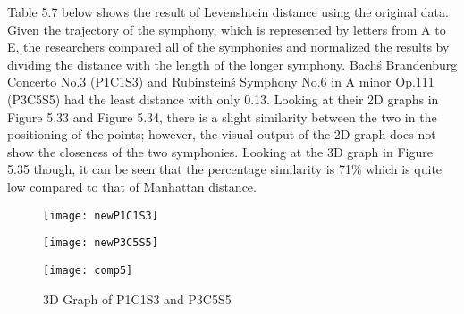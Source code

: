 Table 5.7 below shows the result of Levenshtein distance using the original data. Given the trajectory of the symphony, which is represented by letters from A to E, the researchers compared all of the symphonies and normalized the results by dividing the distance with the length of the longer symphony. Bach\'s Brandenburg Concerto No.3 (P1C1S3) and Rubinstein\'s Symphony No.6 in A minor Op.111 (P3C5S5) had the least distance with only 0.13. Looking at their 2D graphs in Figure 5.33 and Figure 5.34, there is a slight similarity between the two in the positioning of the points; however, the visual output of the 2D graph does not show the closeness of the two symphonies. Looking at the 3D graph in Figure 5.35 though, it can be seen that 
the percentage similarity is 71\% which is quite low compared to that of Manhattan distance.

\begin{figure}[H]
\begin{minipage}{.5\textwidth}
  \centering
  \texttt{[image: newP1C1S3]}
  \label{fig:test1}
\end{minipage}
\begin{minipage}{.5\textwidth}
  \centering
  \texttt{[image: newP3C5S5]}
  \label{fig:test2}
\end{minipage}
\end{figure}

\begin{figure}[H]
\caption{3D Graph of P1C1S3 and P3C5S5}
\centering
\texttt{[image: comp5]}
\end{figure}

